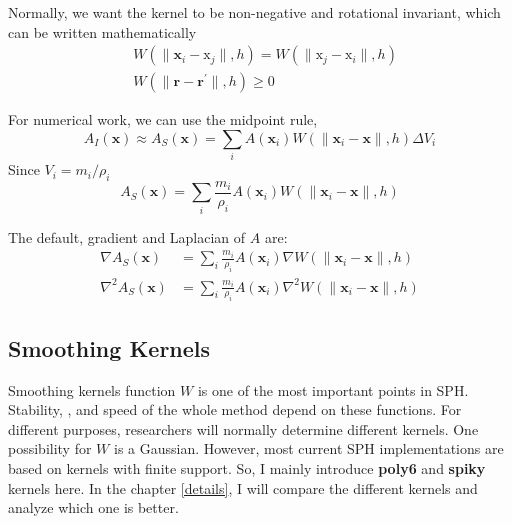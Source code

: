     Normally, we want the kernel to be non-negative and rotational invariant, which can be written mathematically
    \begin{subequations}
        \begin{align}
            & W(\|\textbf{x}_{i} - \text{x}_{j}\|, h) = W(\|\text{x}_{j} - \text{x}_{i}\|, h) \\
            & W(\|\textbf{r} - \textbf{r}^{\prime}\|, h) \ge 0
        \end{align}
    \end{subequations}

    For numerical work, we can use the midpoint rule,
    \begin{equation}
        A_{I}(\textbf{x}) \approx A_{S}(\textbf{x}) = \sum_{i} A(\textbf{x}_{i})W(\|\textbf{x}_{i}-\textbf{x}\|, h)\Delta V_{i}
    \end{equation}
    Since $V_{i} = m_{i}/\rho _{i}$
    \begin{equation}
        A_{S}(\textbf{x}) = \sum_{i} \frac{m_{i}}{\rho_{i}} A(\textbf{x}_{i})W(\|\textbf{x}_{i}-\textbf{x}\|, h)
    \end{equation}

    The default, gradient and Laplacian of $A$ are:
    \begin{subequations}
        \begin{align}
            \nabla A_{S}(\textbf{x}) &= \sum_{i} \frac{m_{i}}{\rho_{i}} A(\textbf{x}_{i})\nabla W(\|\textbf{x}_{i}-\textbf{x}\|, h) \\
            \nabla^{2} A_{S}(\textbf{x}) &= \sum_{i} \frac{m_{i}}{\rho_{i}} A(\textbf{x}_{i})\nabla^{2} W(\|\textbf{x}_{i}-\textbf{x}\|, h)
        \end{align}
        \label{eq:1}
    \end{subequations}

    \subsection{Smoothing Kernels}
    \label{sec:kernels}
    Smoothing kernels function $W$ is one of the most important points in SPH. Stability, , and speed of the whole method depend on these functions. For different purposes, researchers will normally determine different kernels. One possibility for $W$ is a Gaussian. However, most current SPH implementations are based on kernels with finite support. So, I mainly introduce \textbf{poly6} and \textbf{spiky} kernels here. In the chapter \ref{details}, I will compare the different kernels and analyze which one is better.

